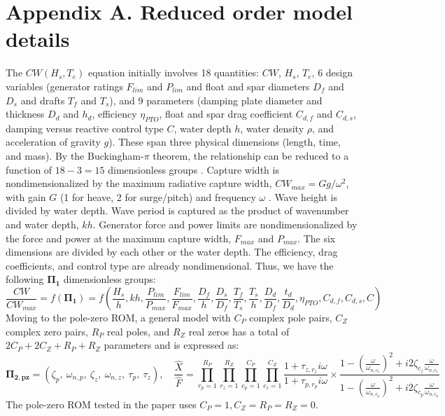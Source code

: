 \documentclass[10pt,twoside]{article}
\begin{document}


\section*{Appendix A. Reduced order model details}
The $CW(H_s,T_e)$ equation initially involves 18 quantities: $CW$, $H_s$, $T_e$,
6 design variables (generator ratings $F_{lim}$ and $P_{lim}$ and float and spar diameters $D_f$ and $D_s$ and drafts $T_f$ and $T_s$), 
and 9 parameters (damping plate diameter and thickness $D_d$ and $h_d$, efficiency $\eta_{PTO}$, float and spar drag coefficient $C_{d,f}$ and $C_{d,s}$, damping versus reactive control type $C$, water depth $h$, water density $\rho$, and acceleration of gravity $g$). 
These span three physical dimensions (length, time, and mass).
By the Buckingham-$\pi$ theorem, the relationship can be reduced to a function of $18-3=15$ dimensionless groups \cite{mckinley_dimensional_2021}. 
Capture width is nondimensionalized by the maximum radiative capture width, $CW_{max}=Gg/\omega^2$, with gain $G$ (1 for heave, 2 for surge/pitch) and frequency $\omega$ \cite{zou_practical_2023}. %
Wave height is divided by water depth. %
Wave period is captured as the product of wavenumber and water depth, $kh$. %
Generator force and power limits are nondimensionalized by the force and power at the maximum capture width, $F_{max}$ and $P_{max}$. %
The six dimensions are divided by each other or the water depth.%
The efficiency, drag coefficients, and control type are already nondimensional. %
Thus, we have the following $\mathbf{\Pi_1}$ dimensionless groups:
\begin{equation}
    \frac{CW}{CW_{max}} = f\left( \mathbf{\Pi_1} \right) = f\left(\frac{H_s}{h}, kh, 
    \frac{P_{lim}}{P_{max}}, \frac{F_{lim}}{F_{max}},
    \frac{D_f}{h}, \frac{D_s}{D_f}, \frac{T_f}{T_s}, \frac{T_s}{h}, \frac{D_d}{D_f}, \frac{t_d}{D_d}, 
    \eta_{PTO}, C_{d,f}, C_{d,s},  C\right)
\end{equation}
Moving to the pole-zero ROM, a general model with $C_P$ complex pole pairs, $C_Z$ complex zero pairs, $R_P$ real poles, and $R_Z$ real zeros has a total of $2C_P+2C_Z+R_P+R_Z$ parameters and is expressed as:
\begin{equation}
    \mathbf{\Pi_{2,pz}} =  \left(
        \zeta_{p},~ \omega_{n,p},~
        \zeta_{z},~ \omega_{n,z},~
        \tau_{p},~ 
        \tau_{z} 
        \right),
    \quad
    \frac{\hat{X}}{\hat{F}} = 
    \prod_{r_p=1}^{R_P} 
    \prod_{r_z=1}^{R_Z} 
    \prod_{c_p=1}^{C_P}
    \prod_{c_z=1}^{C_Z}
    \frac{1+\tau_{z,r_z} i \omega}
         {1+\tau_{p,r_p} i \omega}  \times
    \frac{1-\left(\frac{\omega}{\omega_{n,c_z}}\right)^2 + i 2 \zeta_{c_z} \frac{\omega}{\omega_{n,c_z}}}
         {1-\left(\frac{\omega}{\omega_{n,c_p}}\right)^2 + i 2 \zeta_{c_p} \frac{\omega}{\omega_{n,c_p}}}
    \quad
\end{equation}
The pole-zero ROM tested in the paper uses $C_P=1, C_Z=R_P=R_Z=0$.
\end{document}
